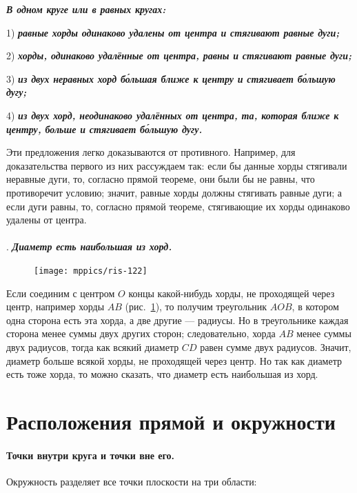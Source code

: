 \documentclass[twoside]{book}
\begin{document}
\textbf{\emph{В одном круге или в равных кругах:}}

1) \textbf{\emph{равные хорды одинаково удалены от центра и стягивают равные дуги;}}

2) \textbf{\emph{хорды, одинаково удалённые от центра, равны и стягивают равные дуги;}}

3) \textbf{\emph{из двух неравных хорд б\'{о}льшая ближе к центру и стягивает б\'{о}льшую дугу;}}

{\sloppy

4) \textbf{\emph{из двух хорд, неодинаково удалённых от центра, та, которая ближе к центру, больше и стягивает б\'{о}льшую дугу.}}

}

Эти предложения легко доказываются от противного.
Например, для доказательства первого из них рассуждаем так:
если бы данные хорды стягивали неравные дуги, то, согласно прямой теореме, они были бы не равны, что противоречит условию;
значит, равные хорды должны стягивать равные дуги;
а если дуги равны, то, согласно прямой теореме, стягивающие их хорды одинаково удалены от центра.

\paragraph{}\label{1938/111}
\mbox{.}
\textbf{\emph{Диаметр есть наибольшая из хорд.}}

\begin{figure}
\centering
\texttt{[image: mppics/ris-122]}
\caption{}\label{1938/ris-122}
\end{figure}

Если соединим с центром $O$ концы какой-нибудь хорды, не проходящей через центр, например хорды $AB$ (рис.~\ref{1938/ris-122}), то получим треугольник $AOB$, в котором одна сторона есть эта хорда, а две другие — радиусы.
Но в треугольнике каждая сторона менее суммы двух других сторон;
следовательно, хорда $AB$ менее суммы двух радиусов, тогда как всякий диаметр $CD$ равен сумме двух радиусов.
Значит, диаметр больше всякой хорды, не проходящей через центр.
Но так как диаметр есть тоже хорда, то можно сказать, что диаметр есть наибольшая из хорд.

\section{Расположения прямой и окружности}

\paragraph{Точки внутри круга и точки вне его.}\label{1914/118}
Окружность разделяет все точки плоскости на три области:
\end{document}
